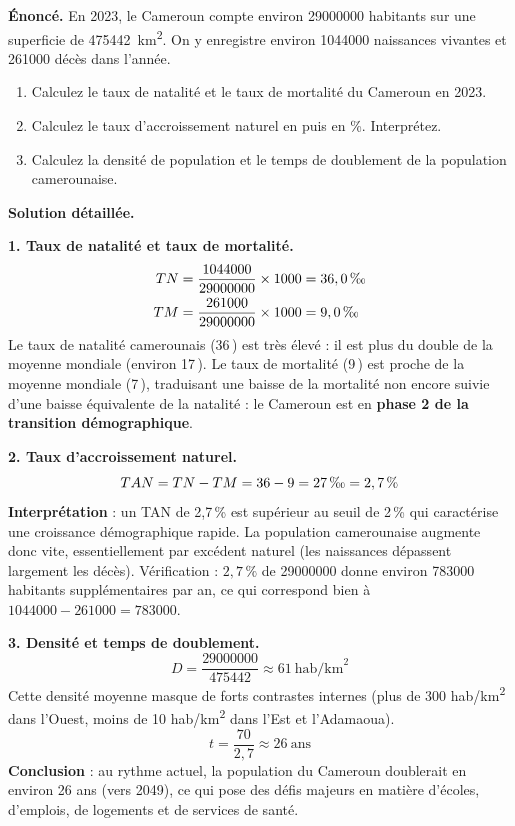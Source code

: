 \documentclass[11pt]{article}
\begin{document}
\begin{exoresolu}
\textbf{Énoncé.} En 2023, le Cameroun compte environ \num{29000000} habitants sur une superficie de \SI{475442}{km^2}. On y enregistre environ \num{1044000} naissances vivantes et \num{261000} décès dans l'année.
\begin{enumerate}
\item Calculez le taux de natalité et le taux de mortalité du Cameroun en 2023.
\item Calculez le taux d'accroissement naturel en \textperthousand puis en \%. Interprétez.
\item Calculez la densité de population et le temps de doublement de la population camerounaise.
\end{enumerate}
\tcblower
\textbf{Solution détaillée.}

\textbf{1. Taux de natalité et taux de mortalité.}
\begin{align*}
TN &= \dfrac{1044000}{29000000} \times 1000 = 36,0\,\text{\textperthousand} \\
TM &= \dfrac{261000}{29000000} \times 1000 = 9,0\,\text{\textperthousand}
\end{align*}
Le taux de natalité camerounais (36\,\textperthousand) est très élevé : il est plus du double de la moyenne mondiale (environ 17\,\textperthousand). Le taux de mortalité (9\,\textperthousand) est proche de la moyenne mondiale (7\,\textperthousand), traduisant une baisse de la mortalité non encore suivie d'une baisse équivalente de la natalité : le Cameroun est en \textbf{phase 2 de la transition démographique}.

\textbf{2. Taux d'accroissement naturel.}
\[ TAN = TN - TM = 36 - 9 = 27\,\text{\textperthousand} = 2,7\,\% \]
\textbf{Interprétation} : un TAN de 2,7\,\% est supérieur au seuil de 2\,\% qui caractérise une croissance démographique rapide. La population camerounaise augmente donc vite, essentiellement par excédent naturel (les naissances dépassent largement les décès). Vérification : $2,7\,\%$ de \num{29000000} donne environ \num{783000} habitants supplémentaires par an, ce qui correspond bien à $1044000 - 261000 = 783000$.

\textbf{3. Densité et temps de doublement.}
\[ D = \dfrac{29000000}{475442} \approx 61\ \text{hab/km}^2 \]
Cette densité moyenne masque de forts contrastes internes (plus de 300 hab/km\textsuperscript{2} dans l'Ouest, moins de 10 hab/km\textsuperscript{2} dans l'Est et l'Adamaoua).
\[ t = \dfrac{70}{2,7} \approx 26\ \text{ans} \]
\textbf{Conclusion} : au rythme actuel, la population du Cameroun doublerait en environ 26 ans (vers 2049), ce qui pose des défis majeurs en matière d'écoles, d'emplois, de logements et de services de santé.
\end{exoresolu}
\end{document}

